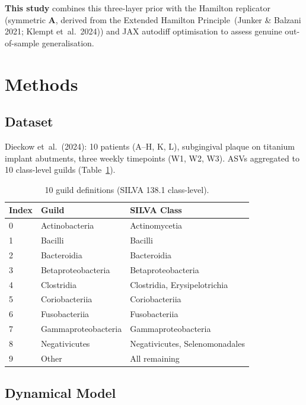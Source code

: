 \documentclass[10pt,a4paper]{article}
\newcommand{\bA}{\mathbf{A}}
\begin{document}
\textbf{This study} combines this three-layer prior with the Hamilton replicator
(symmetric $\bA$, derived from the Extended Hamilton Principle~(Junker \& Balzani 2021; Klempt et~al.\ 2024))
and JAX autodiff optimisation to assess genuine out-of-sample generalisation.

\section{Methods}

\subsection{Dataset}

Dieckow et~al.~(2024): 10 patients (A--H, K, L), subgingival plaque on titanium
implant abutments, three weekly timepoints (W1, W2, W3).
ASVs aggregated to 10 class-level guilds (Table~\ref{tab:guilds}).

\begin{table}[H]
\centering\small
\caption{10 guild definitions (SILVA 138.1 class-level).}
\label{tab:guilds}
\begin{tabular}{lll}
\toprule
Index & Guild & SILVA Class \\
\midrule
0 & Actinobacteria     & Actinomycetia \\
1 & Bacilli            & Bacilli \\
2 & Bacteroidia        & Bacteroidia \\
3 & Betaproteobacteria & Betaproteobacteria \\
4 & Clostridia         & Clostridia, Erysipelotrichia \\
5 & Coriobacteriia     & Coriobacteriia \\
6 & Fusobacteriia      & Fusobacteriia \\
7 & Gammaproteobacteria & Gammaproteobacteria \\
8 & Negativicutes      & Negativicutes, Selenomonadales \\
9 & Other              & All remaining \\
\bottomrule
\end{tabular}
\end{table}

\subsection{Dynamical Model}
\end{document}

